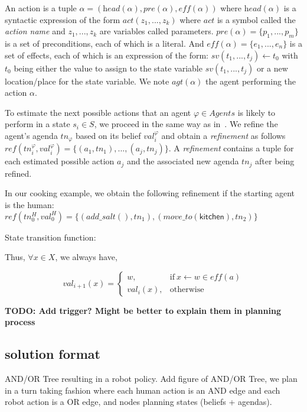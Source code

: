 An action is a tuple $\alpha = (\textit{head}(\alpha), \textit{pre}(\alpha), \textit{eff}(\alpha))$ where $\textit{head}(\alpha)$ is a syntactic expression of the form $\textit{act}(z_1, ..., z_k)$ where $act$ is a symbol called the \textit{action name} and $z_1,...,z_k$ are variables called parameters. $\textit{pre}(\alpha) = \{ p_1, ..., p_m \}$ is a set of preconditions, each of which is a literal. And $\textit{eff}(\alpha) = \{ e_1, ..., e_n \}$ is a set of effects, each of which is an expression of the form: $sv(t_1, ..., t_j) \leftarrow t_0$ with $t_0$ being either the value to assign to the state variable $sv(t_1, ..., t_j)$ or a new location/place for the state variable. We note $\textit{agt}(\alpha)$ the agent performing the action $\alpha$.

To estimate the next possible actions that an agent $\varphi \in Agents$ is likely to perform in a state $s_i \in S$, we proceed in the same way as in~\cite{buisan:hal-03684211}. We refine the agent's agenda $tn_{\varphi}$ based on its belief $val^\varphi_i$ and obtain a \textit{refinement} as follows $\textit{ref}(tn^\varphi_i, val^\varphi_i)= \{ (a_1,tn_1),...,(a_j,tn_j) \}$. 
A \textit{refinement} contains a tuple for each estimated possible action $a_j$ and the associated new agenda $tn_j$ after being refined. 

In our cooking example, we obtain the following refinement if the starting agent is the human:\\
{\small
$\textit{ref}(tn^H_0, val^H_0) = \{ (add\_salt(),tn_1), (move\_to(\textsf{kitchen}),tn_2) \}$
}

State transition function:

Thus, $\forall x \in X$, we always have,

\begin{equation}
    val_{i+1}(x) = \left\{ 
    \begin{array}{ll}
        w, & \mbox{if} ~ x \leftarrow w \in \textit{eff}(a)   \\ 
        val_i(x), & \mbox{otherwise}
    \end{array}\right.
\end{equation}

\textbf{TODO: Add trigger? Might be better to explain them in planning process}


\subsection{solution format}
AND/OR Tree resulting in a robot policy. Add figure of AND/OR Tree, we plan in a turn taking fashion where each human action is an AND edge and each robot action is a OR edge, and nodes planning states (beliefs + agendas).

